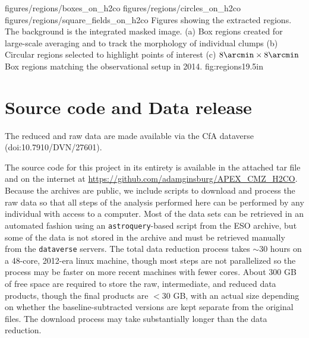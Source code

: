 \RotFigureThreeAA
{figures/regions/boxes_on_h2co}
{figures/regions/circles_on_h2co}
{figures/regions/square_fields_on_h2co}
{Figures showing the extracted regions.  The background is the integrated
masked \para \threeohthree image. (a) Box regions created for large-scale averaging
and to track the morphology of individual clumps  (b) Circular regions selected
to highlight points of interest (c) $8\arcmin \times 8\arcmin$ Box regions
matching the observational setup in 2014.}
{fig:regions}{1}{9.5in}

\section{Source code and Data release}
The reduced and raw data are made available via the CfA dataverse
(doi:10.7910/DVN/27601).

The source code for this project in its entirety is available in the attached
tar file and on the internet at
\url{https://github.com/adamginsburg/APEX_CMZ_H2CO}.
Because the archives are public, we include scripts to download and process the
raw data so that all steps of the analysis performed here can be performed by
any individual with access to a computer.  Most of the data sets can be retrieved
in an automated fashion using an \texttt{astroquery}-based script from the ESO archive,
but some of the data is not stored in the archive and must be retrieved manually from the
\texttt{dataverse} servers. The total data reduction process
takes $\sim30$ hours on a 48-core, 2012-era linux machine, though most steps
are not parallelized so the process may be faster on more recent machines with
fewer cores.  About 300 GB of free space are required to store the raw,
intermediate, and reduced data products, though the final products are $<30$
GB, with an actual size depending on whether the baseline-subtracted versions
are kept separate from the original files.  The download process may take
substantially longer than the data reduction.







